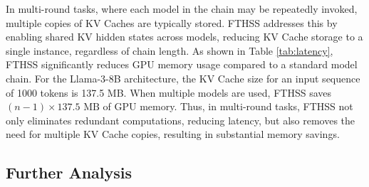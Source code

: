In multi-round tasks, where each model in the chain may be repeatedly invoked, multiple copies of KV Caches are typically stored. FTHSS addresses this by enabling shared KV hidden states across models, reducing KV Cache storage to a single instance, regardless of chain length. As shown in Table \ref{tab:latency}, FTHSS significantly reduces GPU memory usage compared to a standard model chain. For the Llama-3-8B architecture, the KV Cache size for an input sequence of 1000 tokens is 137.5 MB. When multiple models are used, FTHSS saves $(n-1) \times 137.5 \text{ MB}$ of GPU memory. Thus, in multi-round tasks, FTHSS not only eliminates redundant computations, reducing latency, but also removes the need for multiple KV Cache copies, resulting in substantial memory savings.

\subsection{Further Analysis}
\begin{table}[t]
    \centering
\caption{\textbf{Top:} Inference latency of model B in the chain A $\rightarrow$ B, with varying intermediate result lengths (in tokens), while output length is fixed at 16.
\textbf{Bottom:} GPU memory occupancy for KV cache under varying model counts in multi-round tasks, with total length fixed at 1000. Latencies are measured on an NVIDIA L20, with KV states stored in bfloat16.}
    \label{tab:latency}
\end{table}


